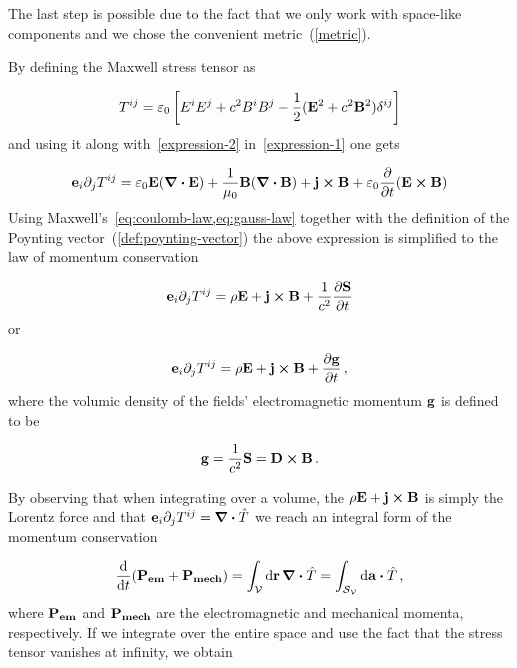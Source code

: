 \documentclass[12pt, class=report, crop=false]{standalone}
\begin{document}
\par
The last step is possible due to the fact that we only work with space-like components and we chose the convenient metric~(\ref{metric}).
\par
By defining the Maxwell stress tensor as

\begin{equation}
  T^{ij} = \varepsilon_0 \left[ E^{i}E^{j} + c^{2} B^{i}B^{j} - \frac{1}{2} (\vb{E}^{2} + c^{2}\vb{B}^2) \delta^{ij} \right]
\end{equation}
and using it along with~\cref{expression-2} in~\cref{expression-1} one gets

\begin{equation*}
  \vb{e}_{i} \partial_{j} T^{ij} = \varepsilon_0 \vb{E}(\div{\vb{E}}) + \frac{1}{\mu_0} \vb{B}(\div{\vb{B}}) + \vb{j}\cp\vb{B} + \varepsilon_0 \pdv{t}(\vb{E}\cp\vb{B})
\end{equation*}
Using Maxwell's~\cref{eq:coulomb-law,eq:gauss-law} together with the definition of the Poynting vector~(\ref{def:poynting-vector}) the above expression is simplified to the law of momentum conservation

\begin{equation}
  \vb{e}_{i} \partial_{j} T^{ij} = \rho \vb{E} + \vb{j}\cp\vb{B} + \frac{1}{c^{2}} \pdv{\vb{S}}{t}
\end{equation}
or

\begin{equation}
  \vb{e}_{i} \partial_{j} T^{ij} = \rho \vb{E} + \vb{j}\cp\vb{B} + \pdv{\vb{g}}{t}  \,,
\end{equation}
where the volumic density of the fields' electromagnetic momentum \(\vb{g}\) is defined to be

\begin{equation}
  \label{def:electromagnetic-momentum}
  \vb{g} = \frac{1}{c^{2}} \vb{S} = \vb{D}\cp \vb{B} \,.
\end{equation}

\par
By observing that when integrating over a volume, the \(\rho \vb{E} + \vb{j}\cp\vb{B}\) is simply the Lorentz force and that \(\vb{e}_{i} \partial_{j} T^{ij} = \div{\hat{T}}\) we reach an integral form of the momentum conservation

\begin{equation}
  \dv{t} (\vb{P_{em}}+\vb{P_{mech}}) = \int_\mathcal{V} \dd{\vb{r}} \div{\hat{T}} = \int_{\mathcal{S}_\mathcal{V}} \dd{\vb{a}} \vdot \hat{T} \,,
\end{equation}
where \(\vb{P_{em}}\) and \(\vb{P_{mech}}\) are the electromagnetic and mechanical momenta, respectively. If we integrate over the entire space and use the fact that the stress tensor vanishes at infinity, we obtain
\end{document}
